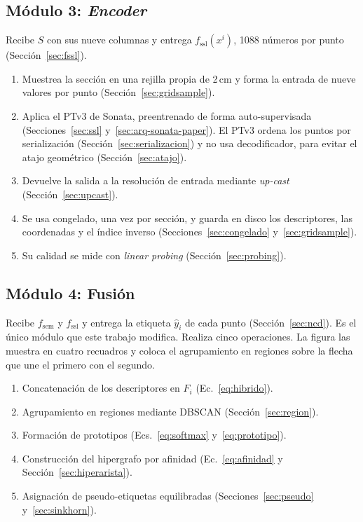 \subsection{Módulo 3: \emph{Encoder}}
\label{sec:modulo3}

Recibe $S$ con sus nueve columnas y entrega $f_{\mathrm{ssl}}(x^i)$, 1088
números por punto (Sección~\ref{sec:fssl}).
\begin{enumerate}\setlength{\itemsep}{1pt}
\item Muestrea la sección en una rejilla propia de 2\,cm y forma la entrada de
nueve valores por punto (Sección~\ref{sec:gridsample}).
\item Aplica el PTv3 de Sonata, preentrenado de forma auto-supervisada
(Secciones~\ref{sec:ssl} y~\ref{sec:arq-sonata-paper}). El PTv3 ordena los
puntos por serialización (Sección~\ref{sec:serializacion}) y no usa
decodificador, para evitar el atajo geométrico (Sección~\ref{sec:atajo}).
\item Devuelve la salida a la resolución de entrada mediante \emph{up-cast}
(Sección~\ref{sec:upcast}).
\item Se usa congelado, una vez por sección, y guarda en disco los
descriptores, las coordenadas y el índice inverso
(Secciones~\ref{sec:congelado} y~\ref{sec:gridsample}).
\item Su calidad se mide con \emph{linear probing}
(Sección~\ref{sec:probing}).
\end{enumerate}

\subsection{Módulo 4: Fusión}
\label{sec:modulo4}

Recibe $f_{\mathrm{sem}}$ y $f_{\mathrm{ssl}}$ y entrega la etiqueta
$\hat{y}_i$ de cada punto (Sección~\ref{sec:ncd}). Es el único módulo que este
trabajo modifica. Realiza cinco operaciones. La figura las muestra en cuatro
recuadros y coloca el agrupamiento en regiones sobre la flecha que une el primero
con el segundo.
\begin{enumerate}\setlength{\itemsep}{1pt}
\item Concatenación de los descriptores en $F_i$ (Ec.~\eqref{eq:hibrido}).
\item Agrupamiento en regiones mediante DBSCAN (Sección~\ref{sec:region}).
\item Formación de prototipos (Ecs.~\eqref{eq:softmax}
y~\eqref{eq:prototipo}).
\item Construcción del hipergrafo por afinidad
(Ec.~\eqref{eq:afinidad} y Sección~\ref{sec:hiperarista}).
\item Asignación de pseudo-etiquetas equilibradas
(Secciones~\ref{sec:pseudo} y~\ref{sec:sinkhorn}).
\end{enumerate}


